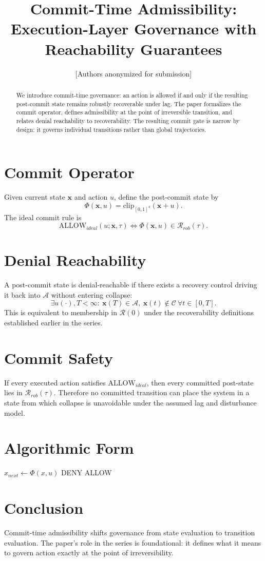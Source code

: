 \documentclass[letterpaper,10pt,conference]{ieeeconf}
\title{\bf Commit-Time Admissibility: Execution-Layer Governance with Reachability Guarantees}
\author{[Authors anonymized for submission]}
\newcommand{\x}{\mathbf{x}}
\newcommand{\A}{\mathcal{A}}
\newcommand{\Rset}{\mathcal{R}}
\newcommand{\Rrob}{\mathcal{R}_{rob}}
\newcommand{\Cset}{\mathcal{C}}
\newcommand{\Phiop}{\Phi}
\begin{document}
\maketitle
\thispagestyle{empty}
\pagestyle{empty}
\begin{abstract}
We introduce commit-time governance: an action is allowed if and only if the resulting post-commit state remains robustly recoverable under lag. The paper formalizes the commit operator, defines admissibility at the point of irreversible transition, and relates denial reachability to recoverability. The resulting commit gate is narrow by design: it governs individual transitions rather than global trajectories.
\end{abstract}
\section{Commit Operator}
Given current state $\x$ and action $u$, define the post-commit state by
\[
\Phiop(\x,u)=\mathrm{clip}_{[0,1]^4}(\x+u).
\]
The ideal commit rule is
\[
\mathrm{ALLOW}_{ideal}(u;\x,\tau)\iff \Phiop(\x,u)\in\Rrob(\tau).
\]
\section{Denial Reachability}
A post-commit state is denial-reachable if there exists a recovery control driving it back into $\A$ without entering collapse:
\[
\exists u(\cdot),T<\infty:\ \x(T)\in\A,\ \x(t)\notin\Cset\ \forall t\in[0,T].
\]
This is equivalent to membership in $\Rset(0)$ under the recoverability definitions established earlier in the series.
\section{Commit Safety}
If every executed action satisfies $\mathrm{ALLOW}_{ideal}$, then every committed post-state lies in $\Rrob(\tau)$. Therefore no committed transition can place the system in a state from which collapse is unavoidable under the assumed lag and disturbance model.
\section{Algorithmic Form}
\begin{algorithm}
\caption{Ideal Commit Gate}
\begin{algorithmic}[1]
\State $x_{next}\gets \Phiop(x,u)$
\If{$x_{next}\notin\Rrob(\tau)$}
    \State \Return DENY
\Else
    \State \Return ALLOW
\EndIf
\end{algorithmic}
\end{algorithm}
\section{Conclusion}
Commit-time admissibility shifts governance from state evaluation to transition evaluation. The paper's role in the series is foundational: it defines what it means to govern action exactly at the point of irreversibility.
\end{document}
